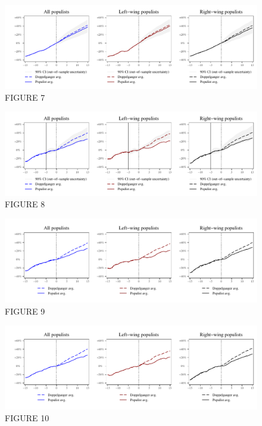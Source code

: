 \documentclass{article}
\begin{document}
\clearpage

\begin{figure}	
	\caption{FIGURE 7} 
		\includegraphics[scale=0.8]{Figure7}\centering	
\end{figure}

\clearpage

\begin{figure}	
	\caption{FIGURE 8} 
		\includegraphics[scale=0.8]{Figure8}\centering	
\end{figure}

\clearpage

\begin{figure}	
	\caption{FIGURE 9} 
		\includegraphics[scale=0.8]{Figure9}\centering	
\end{figure}

\clearpage

\begin{figure}	
	\caption{FIGURE 10} 
		\includegraphics[scale=0.8]{Figure10}\centering	
\end{figure}
\end{document}

